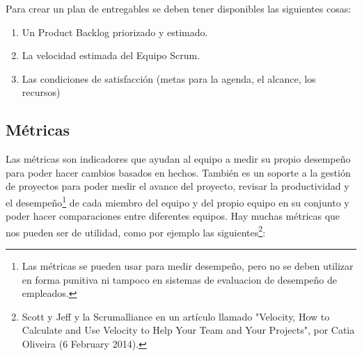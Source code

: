 Para crear un plan de entregables se deben tener disponibles las siguientes cosas:

\begin{enumerate}
\item Un Product Backlog priorizado y estimado.
\item La velocidad estimada del Equipo Scrum.
\item Las condiciones de satisfacción (metas para la agenda, el alcance, los recursos)
\end{enumerate}

\subsection{Métricas}

Las métricas son indicadores que ayudan al equipo a medir su propio desempeño para poder hacer cambios basados en hechos. También es un soporte a la gestión de proyectos para poder medir el avance del proyecto, revisar la productividad y el desempeño\footnote{Las métricas se pueden usar para medir desempeño, pero no se deben utilizar en forma punitiva ni tampoco en sistemas de evaluacion de desempeño de empleados.} de cada miembro del equipo y del propio equipo en su conjunto y poder hacer comparaciones entre diferentes equipos. Hay muchas métricas que nos pueden ser de utilidad, como por ejemplo las siguientes\footnote{Scott y Jeff \cite{Scott-Jeff-2013} y la  Scrumalliance en un artículo llamado "Velocity, How to Calculate and Use Velocity to Help Your Team and Your Projects", por Catia Oliveira (6 February 2014).}:

